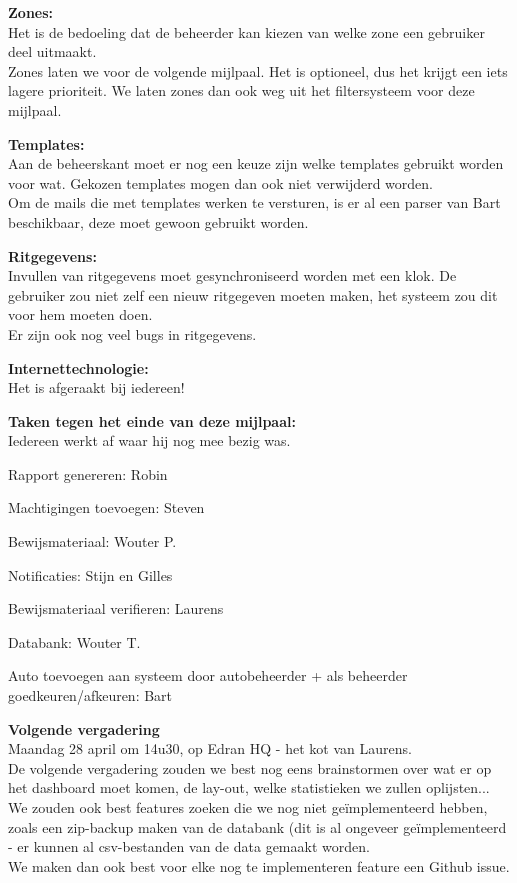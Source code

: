 \documentclass[11pt,a4paper,oneside]{article}
\renewenvironment{itemize}[1]{\begin{compactitem}#1}{\end{compactitem}}
\begin{document}
\begin{itemize}
\item \textbf{Zones:\\}
Het is de bedoeling dat de beheerder kan kiezen van welke zone een gebruiker deel uitmaakt.\\
Zones laten we voor de volgende mijlpaal. Het is optioneel, dus het krijgt een iets lagere prioriteit. We laten zones dan ook weg uit het filtersysteem voor deze mijlpaal.

\item \textbf{Templates:\\}
Aan de beheerskant moet er nog een keuze zijn welke templates gebruikt worden voor wat. Gekozen templates mogen dan ook niet verwijderd worden.\\
Om de mails die met templates werken te versturen, is er al een parser van Bart beschikbaar, deze moet gewoon gebruikt worden.

\item \textbf{Ritgegevens:\\}
Invullen van ritgegevens moet gesynchroniseerd worden met een klok. De gebruiker zou niet zelf een nieuw ritgegeven moeten maken, het systeem zou dit voor hem moeten doen.\\
Er zijn ook nog veel bugs in ritgegevens.

\item \textbf{Internettechnologie:\\}
Het is afgeraakt bij iedereen!

\item \textbf{Taken tegen het einde van deze mijlpaal:\\}
Iedereen werkt af waar hij nog mee bezig was.
\begin{itemize}
\item Rapport genereren: Robin
\item Machtigingen toevoegen: Steven
\item Bewijsmateriaal: Wouter P.
\item Notificaties: Stijn en Gilles
\item Bewijsmateriaal verifieren: Laurens
\item Databank: Wouter T.
\item Auto toevoegen aan systeem door autobeheerder + als beheerder goedkeuren/afkeuren: Bart
\end{itemize}

\par\item \textbf{Volgende vergadering} \\
Maandag 28 april om 14u30, op Edran HQ - het kot van Laurens.\\
De volgende vergadering zouden we best nog eens brainstormen over wat er op het dashboard moet komen, de lay-out, welke statistieken we zullen oplijsten...\\
We zouden ook best features zoeken die we nog niet ge\"implementeerd hebben, zoals een zip-backup maken van de databank (dit is al ongeveer ge\"implementeerd - er kunnen al csv-bestanden van de data gemaakt worden.\\
We maken dan ook best voor elke nog te implementeren feature een Github issue.


\end{itemize}
\end{document}
